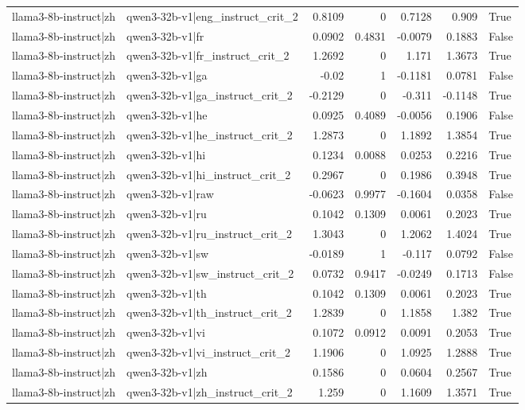\begin{table}
\begin{tabular}{l l r r r r l}
llama3-8b-instruct|zh & qwen3-32b-v1|eng_instruct_crit_2 & 0.8109 & 0 & 0.7128 & 0.909 & True \\
llama3-8b-instruct|zh & qwen3-32b-v1|fr & 0.0902 & 0.4831 & -0.0079 & 0.1883 & False \\
llama3-8b-instruct|zh & qwen3-32b-v1|fr_instruct_crit_2 & 1.2692 & 0 & 1.171 & 1.3673 & True \\
llama3-8b-instruct|zh & qwen3-32b-v1|ga & -0.02 & 1 & -0.1181 & 0.0781 & False \\
llama3-8b-instruct|zh & qwen3-32b-v1|ga_instruct_crit_2 & -0.2129 & 0 & -0.311 & -0.1148 & True \\
llama3-8b-instruct|zh & qwen3-32b-v1|he & 0.0925 & 0.4089 & -0.0056 & 0.1906 & False \\
llama3-8b-instruct|zh & qwen3-32b-v1|he_instruct_crit_2 & 1.2873 & 0 & 1.1892 & 1.3854 & True \\
llama3-8b-instruct|zh & qwen3-32b-v1|hi & 0.1234 & 0.0088 & 0.0253 & 0.2216 & True \\
llama3-8b-instruct|zh & qwen3-32b-v1|hi_instruct_crit_2 & 0.2967 & 0 & 0.1986 & 0.3948 & True \\
llama3-8b-instruct|zh & qwen3-32b-v1|raw & -0.0623 & 0.9977 & -0.1604 & 0.0358 & False \\
llama3-8b-instruct|zh & qwen3-32b-v1|ru & 0.1042 & 0.1309 & 0.0061 & 0.2023 & True \\
llama3-8b-instruct|zh & qwen3-32b-v1|ru_instruct_crit_2 & 1.3043 & 0 & 1.2062 & 1.4024 & True \\
llama3-8b-instruct|zh & qwen3-32b-v1|sw & -0.0189 & 1 & -0.117 & 0.0792 & False \\
llama3-8b-instruct|zh & qwen3-32b-v1|sw_instruct_crit_2 & 0.0732 & 0.9417 & -0.0249 & 0.1713 & False \\
llama3-8b-instruct|zh & qwen3-32b-v1|th & 0.1042 & 0.1309 & 0.0061 & 0.2023 & True \\
llama3-8b-instruct|zh & qwen3-32b-v1|th_instruct_crit_2 & 1.2839 & 0 & 1.1858 & 1.382 & True \\
llama3-8b-instruct|zh & qwen3-32b-v1|vi & 0.1072 & 0.0912 & 0.0091 & 0.2053 & True \\
llama3-8b-instruct|zh & qwen3-32b-v1|vi_instruct_crit_2 & 1.1906 & 0 & 1.0925 & 1.2888 & True \\
llama3-8b-instruct|zh & qwen3-32b-v1|zh & 0.1586 & 0 & 0.0604 & 0.2567 & True \\
llama3-8b-instruct|zh & qwen3-32b-v1|zh_instruct_crit_2 & 1.259 & 0 & 1.1609 & 1.3571 & True \\

\end{tabular}
\end{table}

